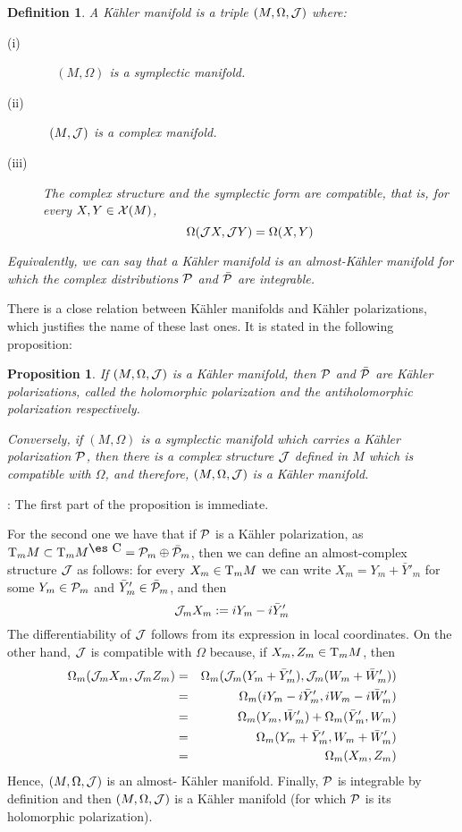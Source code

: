 \documentclass[12pt]{article}
\theoremstyle{plain}
\newtheorem{prop}{Proposition}
\newtheorem{definition}{Definition}
\def\beann{\begin{eqnarray*}}
\def\eeann{\end{eqnarray*}}
\def\qed{\ifvmode\removelastskip\fi
{\unskip\nobreak\hfil\penalty50\hbox{}\nobreak\hfil
\hbox{\vrule height1.2ex width1.2ex}\parfillskip=0pt
\finalhyphendemerits=0 \par\smallskip}}
\def\P{{\cal P}}
\def\Complex{\mbox{\es C}}
\def\Tan{{\rm T}}
\begin{document}
\begin{definition}
A {\rm K\"ahler manifold} is a triple $(M,\Omega ,{\cal J})$ where:
\begin{description}
\item[{\rm (i)}]\ \
$(M,\Omega )$ is a symplectic manifold.
\item[{\rm (ii)}]\
$(M,{\cal J})$ is a complex manifold.
\item[{\rm (iii)}]
The complex structure and the symplectic form
are compatible, that is, for every $X,Y \in {\cal X}(M)$,
$$
\Omega ({\cal J}X,{\cal J}Y) =  \Omega (X,Y)
$$
\end{description}

\noindent Equivalently, we can say that a K\"ahler manifold
is an almost-K\"ahler manifold for which
the complex distributions $\P$ and $\bar \P$ are integrable.
\end{definition}

There is a close relation between K\"ahler manifolds
and K\"ahler polarizations,
which justifies the name of these last ones.
It is stated in the following proposition:

\begin{prop}
If $(M,\Omega ,{\cal J})$ is a K\"ahler manifold,
then $\P$ and $\bar \P$ are K\"ahler polarizations,
called the {\rm holomorphic polarization} and
the {\rm antiholomorphic polarization} respectively.

Conversely, if $(M,\Omega)$ is a symplectic manifold
which carries a K\"ahler polarization $\P$,
then there is a complex structure ${\cal J}$ defined in $M$
which is compatible with $\Omega$,
and therefore, $(M,\Omega ,{\cal J})$ is a K\"ahler manifold.
\end{prop}
\noindent{\bf Proof}: 
The first part of the proposition is immediate.

For the second one we have that
if $\P$ is a K\"ahler polarization, as
$\Tan_mM \subset \Tan_m M^{\Complex} = \P_m \oplus \bar \P_m$,
then we can define an almost-complex structure ${\cal J}$
as follows: for every $X_m \in \Tan_m M$
we can write $X_m = Y_m + \bar Y'_m$ for some
$Y_m \in \P_m$ and $\bar Y'_m \in \bar \P_m$,
and then
$$
{\cal J}_mX_m := iY_m - i\bar Y'_m
$$
The differentiability of ${\cal J}$ follows from
its expression in local coordinates.
On the other hand, ${\cal J}$ is compatible with $\Omega$
because, if $X_m,Z_m \in \Tan_m M$, then
\beann
\Omega_m ({\cal J}_mX_m,{\cal J}_mZ_m)&=&
\Omega_m ({\cal J}_m(Y_m+\bar Y'_m),{\cal J}_m(W_m+\bar W'_m))\\
&=& \Omega_m (iY_m-i\bar Y'_m,iW_m-i\bar W'_m)
\\
&=&\Omega_m (Y_m,\bar W'_m) + \Omega_m (\bar Y'_m,W_m)\\
&=&\Omega_m (Y_m+\bar Y'_m,W_m+\bar W'_m)\\
&=& \Omega_m (X_m,Z_m)
\eeann
Hence, $(M,\Omega ,{\cal J})$ is an almost- K\"ahler manifold.
Finally, $\P$ is integrable by definition
and then $(M,\Omega ,{\cal J})$ is a K\"ahler manifold
(for which $\P$ is its holomorphic polarization).
\qed
\end{document}
